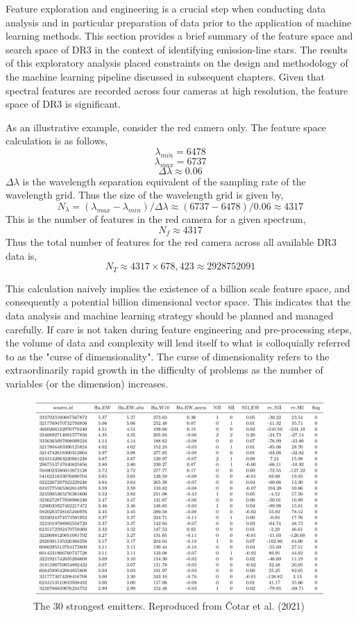 Feature exploration and engineering is a crucial step when conducting data analysis and in particular preparation of data prior to the application of machine learning methods. This section provides a brief summary of the feature space and search space of DR3 in the context of identifying emission-line stars. The results of this exploratory analysis placed constraints on the design and methodology of the machine learning pipeline discussed in subsequent chapters. Given that spectral features are recorded across four cameras at high resolution, the feature space of DR3 is significant. 

As an illustrative example, consider the red camera only. The feature space calculation is as follows,
\[\lambda_{min} = 6478\]
\[\lambda_{max} = 6737\]
\[\Delta\lambda \approx 0.06\]
$\Delta\lambda$ is the wavelength separation equivalent of the sampling rate of the wavelength grid. Thus the size of the wavelength grid is given by, \[N_{\lambda} = (\lambda_{max}-\lambda_{min})/\Delta\lambda \approx (6737-6478)/0.06 \approx 4317\]
This is the number of features in the red camera for a given spectrum, \[N_{f} \approx 4317\]
Thus the total number of features for the red camera across all available DR3 data is, \[N_{T} \approx 4317\times678,423 \approx \num[round-precision=2,round-mode=figures,
     scientific-notation=true]{2928752091}\]

This calculation naively implies the existence of a billion scale feature space, and consequently a potential billion dimensional vector space. This indicates that the data analysis and machine learning strategy should be planned and managed carefully. If care is not taken during feature engineering and pre-processing steps, the volume of data and complexity will lend itself to what is colloquially referred to as the "curse of dimensionality". The curse of dimensionality refers to the extraordinarily rapid growth in the difficulty of problems as the number of variables (or the dimension) increases\cite{kuo2005lifting}.

\begin{figure}[!htb]
\centering
\includegraphics[scale=.45]{figures/cotartable.png}
\caption{The 30 strongest emitters. Reproduced from Čotar et al. (2021)\cite{vcotar2021galah}}
\end{figure}

